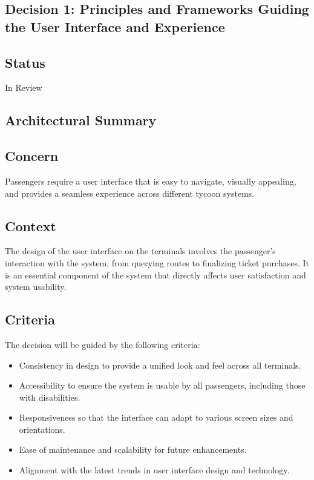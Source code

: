 \subsection{Decision 1: Principles and Frameworks Guiding the User Interface and Experience}

\subsection*{Status}
In Review

\subsection*{Architectural Summary}

\subsection*{Concern}
Passengers require a user interface that is easy to navigate, visually appealing, and provides a seamless experience across different tycoon systems.

\subsection*{Context}
The design of the user interface on the terminals involves the passenger's interaction with the system, from querying routes to finalizing ticket purchases. It is an essential component of the system that directly affects user satisfaction and system usability.

\subsection*{Criteria}
The decision will be guided by the following criteria:
\begin{itemize}
    \item Consistency in design to provide a unified look and feel across all terminals.
    \item Accessibility to ensure the system is usable by all passengers, including those with disabilities.
    \item Responsiveness so that the interface can adapt to various screen sizes and orientations.
    \item Ease of maintenance and scalability for future enhancements.
    \item Alignment with the latest trends in user interface design and technology.
\end{itemize}

